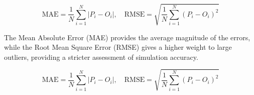 \begin{equation}
    \text{MAE} = \frac{1}{N} \sum_{i=1}^{N} |P_i - O_i|, \quad \text{RMSE} = \sqrt{\frac{1}{N} \sum_{i=1}^{N} (P_i - O_i)^2}
\end{equation}

The Mean Absolute Error (MAE) provides the average magnitude of the errors, while the Root Mean Square Error (RMSE) gives a higher weight to large outliers, providing a stricter assessment of simulation accuracy.

\begin{equation}
    \text{MAE} = \frac{1}{N} \sum_{i=1}^{N} |P_i - O_i|, \quad \text{RMSE} = \sqrt{\frac{1}{N} \sum_{i=1}^{N} (P_i - O_i)^2}\end{equation}

\newpage